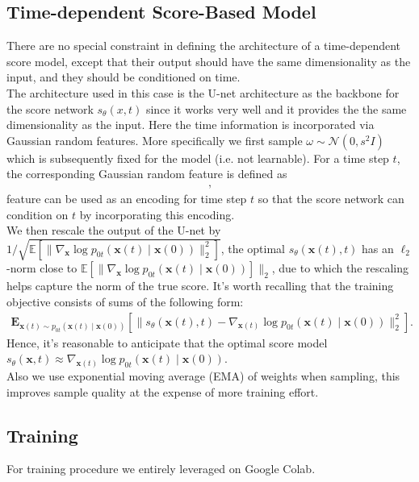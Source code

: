\documentclass{article}
\begin{document}
\subsection{Time-dependent Score-Based Model}
There are no special constraint in defining the architecture of a time-dependent score model, except that their output should have the same dimensionality as the input, and they should be conditioned on time. \\
The architecture used in this case is the U-net architecture as the backbone for the score network $s_{\theta}(x,t)$ since it works very well and it provides the the same dimensionality as the input. Here the time information is incorporated via Gaussian random features. More specifically we first sample $\omega \sim \mathcal{N}(0,s^2I)$ which is subsequently fixed for the model (i.e. not learnable). For a time step $t$, the corresponding Gaussian random feature is defined as
\begin{align}
  [\sin(2\pi \omega t) ; \cos(2\pi \omega t)],
\end{align}
feature can be used as an encoding for time step $t$ so that the score network can condition on $t$ by incorporating this encoding.\\
We then rescale the output of the U-net by $1/\sqrt{\mathbb{E}[\|\nabla_{\mathbf{x}}\log p_{0t}(\mathbf{x}(t) \mid \mathbf{x}(0)) \|_2^2]}$, the optimal $s_\theta(\mathbf{x}(t), t)$ has an $\ell_2$-norm close to $\mathbb{E}[\|\nabla_{\mathbf{x}}\log p_{0t}(\mathbf{x}(t) \mid \mathbf{x}(0))]\|_2$, due to which the rescaling helps capture the norm of the true score. It's worth recalling that the training objective consists of sums of the following form:
\begin{align*}
\mathbf{E}_{\mathbf{x}(t) \sim p_{0t}(\mathbf{x}(t) \mid \mathbf{x}(0))}[ \|s_\theta(\mathbf{x}(t), t) - \nabla_{\mathbf{x}(t)}\log p_{0t}(\mathbf{x}(t) \mid \mathbf{x}(0))\|_2^2].
\end{align*}
Hence, it's reasonable to anticipate that the optimal score model $s_\theta(\mathbf{x}, t) \approx \nabla_{\mathbf{x}(t)} \log p_{0t}(\mathbf{x}(t) \mid \mathbf{x}(0))$.\\ 
Also we use exponential moving average (EMA) of weights when sampling, this improves sample quality at the expense of more training effort.
\subsection{Training}
For training procedure we entirely leveraged on Google Colab.
\end{document}
